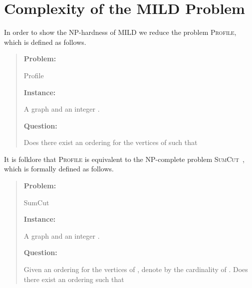 \documentclass{llncs}
\begin{document}
\section{Complexity of the MILD Problem}\label{se:complexity}



In order to show the NP-hardness of \textsc{MILD} we reduce the problem \textsc{Profile}, which is defined as follows.

\begin{quote}
{\bf Problem:} 
\begin{minipage}[t]{.90\linewidth} 
{\sc Profile}
\end{minipage}\par\vspace{2pt}
{\bf Instance:} 
\begin{minipage}[t]{.90\linewidth} 
A graph  and an integer .
\end{minipage}\par\vspace{2pt}
{\bf Question:} 
\begin{minipage}[t]{.90\linewidth} 
Does there exist an ordering  for the vertices of  such that 

\end{minipage}
\end{quote}

It is folklore\footnotemark[1] that \textsc{Profile} is equivalent to the NP-complete problem \textsc{SumCut}~\cite{dgpt-mp-91,g-tvsng-97,ly-pmpmg-94}, which is formally defined as follows.

\begin{quote}
{\bf Problem:} 
\begin{minipage}[t]{.90\linewidth} 
{\sc SumCut}
\end{minipage}\par\vspace{2pt}
{\bf Instance:} 
\begin{minipage}[t]{.90\linewidth} 
A graph  and an integer .
\end{minipage}\par\vspace{2pt}
{\bf Question:} 
\begin{minipage}[t]{.90\linewidth} 
Given an ordering  for the vertices of , denote by  the cardinality of . Does there exist an ordering  such that 

\end{minipage}
\end{quote}
\end{document}
